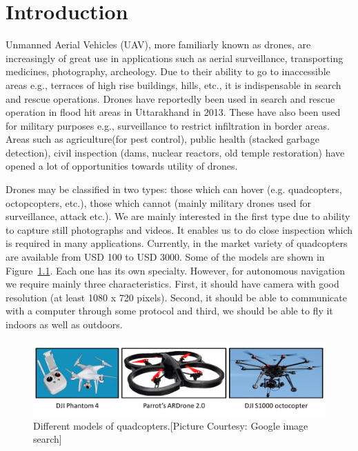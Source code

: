 \chapter{Introduction}
\label{ch:intro}
Unmanned Aerial Vehicles (UAV), more familiarly known as drones, are
increasingly of great use in applications such as aerial
surveillance\cite{dronesurvey1, dronesurvey3}, transporting
medicines\cite{dronedelivery1,dronedelivery2}, photography\cite{dronephoto1,
dronephoto2, dronephoto3}, archeology\cite{dronearchaeology}.
Due to their ability to go to inaccessible areas e.g., terraces of high rise
buildings, hills, etc., it is indispensable in search and rescue operations.
Drones have reportedly been used in search and rescue operation in flood hit
areas in Uttarakhand in 2013. These have also been used for military
purposes e.g., surveillance to restrict infiltration in border areas\cite{dronesurvey2}.
Areas such as agriculture(for pest control), public health (stacked garbage
detection), civil inspection (dams, nuclear reactors, old temple restoration) have 
opened a lot of opportunities towards utility of drones.

Drones may be classified in two types: those which can hover (e.g.
quadcopters, octopcopters, etc.), those which cannot (mainly military drones
used for surveillance, attack etc.). We are mainly interested in the first type due
to ability to capture still photographs and videos. It enables us to do
close inspection which is required in many applications. Currently, in the
market variety of quadcopters are available from USD 100 to USD 3000.
Some of the models are shown in Figure~\ref{fig:quadcopters}.
Each one has its own specialty. However, for autonomous navigation we require mainly
three characteristics. First, it should have camera with good resolution (at
least 1080 x 720 pixels). Second, it should be able to communicate with a
computer through some protocol and third, we should be able to fly it indoors as
well as outdoors.

\begin{figure}[h!]
\centering
\includegraphics[width=0.98\linewidth]{figures/quadcopters}
\caption[Different models of quadcopters]{Different models of
quadcopters.[Picture Courtesy: Google image search]}
\label{fig:quadcopters}
\end{figure}

